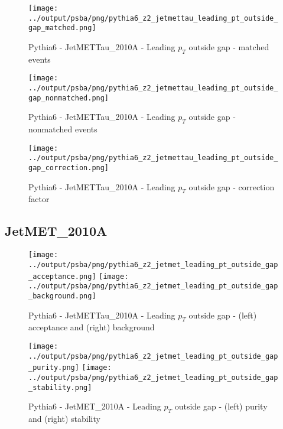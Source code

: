 \documentclass[11pt]{book}
\begin{document}
\begin{figure}[ht]
\centering
\texttt{[image: ../output/psba/png/pythia6\_z2\_jetmettau\_leading\_pt\_outside\_gap\_matched.png]}
\caption{Pythia6 - JetMETTau\_2010A - Leading $p_{T}$ outside gap - matched events}
\label{fig:p6_jetmettau_leading_pt_outside_gap_matched}
\end{figure}

\begin{figure}[ht]
\centering
\texttt{[image: ../output/psba/png/pythia6\_z2\_jetmettau\_leading\_pt\_outside\_gap\_nonmatched.png]}
\caption{Pythia6 - JetMETTau\_2010A - Leading $p_{T}$ outside gap - nonmatched events}
\label{fig:p6_jetmettau_leading_pt_outside_gap_nonmatched}
\end{figure}

\begin{figure}[ht]
\centering
\texttt{[image: ../output/psba/png/pythia6\_z2\_jetmettau\_leading\_pt\_outside\_gap\_correction.png]}
\caption{Pythia6 - JetMETTau\_2010A - Leading $p_{T}$ outside gap - correction factor}
\label{fig:p6_jetmettau_leading_pt_outside_gap_correction}
\end{figure}


\clearpage
\subsection{JetMET\_2010A}

\begin{figure}[ht]
\centering
\texttt{[image: ../output/psba/png/pythia6\_z2\_jetmet\_leading\_pt\_outside\_gap\_acceptance.png]}
\texttt{[image: ../output/psba/png/pythia6\_z2\_jetmet\_leading\_pt\_outside\_gap\_background.png]}
\caption{Pythia6 - JetMETTau\_2010A - Leading $p_{T}$ outside gap - (left) acceptance and (right) background}
\label{fig:p6_jetmettau_leading_pt_outside_gap_ab}
\end{figure}

\begin{figure}[ht]
\centering
\texttt{[image: ../output/psba/png/pythia6\_z2\_jetmet\_leading\_pt\_outside\_gap\_purity.png]}
\texttt{[image: ../output/psba/png/pythia6\_z2\_jetmet\_leading\_pt\_outside\_gap\_stability.png]}
\caption{Pythia6 - JetMET\_2010A - Leading $p_{T}$ outside gap - (left) purity and (right) stability}
\label{fig:p6_jetmet_leading_pt_outside_gap_ps}
\end{figure}
\end{document}
